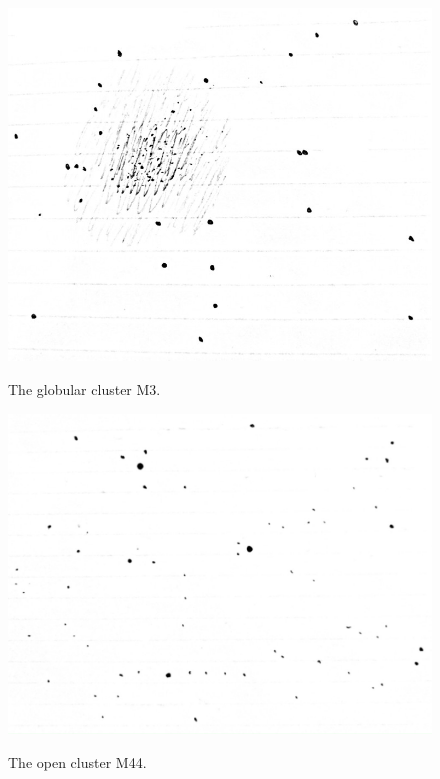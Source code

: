 \documentclass[11pt]{article}
\begin{document}
\begin{figure}[H]
\caption{The globular cluster M3.}
\begin{center}
\includegraphics[scale=0.5]{figures/m3.jpg}
\label{fig:m3}
\end{center}
\end{figure}

\begin{figure}[H]
\caption{The open cluster M44.}
\begin{center}
\includegraphics[scale=0.5]{figures/m44.jpg}
\label{fig:m44}
\end{center}
\end{figure}
\end{document}

